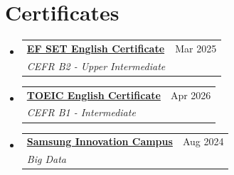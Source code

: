 \documentclass[a4paper,11pt]{article}
\makeatletter
\newcommand{\resumeSubheading}[4]{
  \vspace{-3pt}\item
    \begin{tabular*}{\textwidth}[t]{l@{\extracolsep{\fill}}r}
      \textbf{#1} & #2 \\
      \textit{\small#3} & \textit{\small #4} \\
    \end{tabular*}\vspace{-8pt}
}
\newcommand{\resumeSubHeadingListStart}{\begin{itemize}[leftmargin=0.12in, label={}, itemsep=0pt]}
\newcommand{\resumeSubHeadingListEnd}{\end{itemize}}
\makeatother
\begin{document}
\section{Certificates}
  \resumeSubHeadingListStart
    \resumeSubheading
      {\href{https://cert.efset.org/vi/9U4jQU}{EF SET English Certificate }}{Mar 2025}
      {CEFR B2 - Upper Intermediate}{}
      \resumeSubheading
      {\href{https://cert.efset.org/vi/9U4jQU}{TOEIC English Certificate }}{Apr 2026}
      {CEFR B1 - Intermediate}{}

    \resumeSubheading
      {\href{https://tinyurl.com/2xxoyzgk}{Samsung Innovation Campus}}{Aug 2024}
      {Big Data}{}
  \resumeSubHeadingListEnd

  
\end{document}

